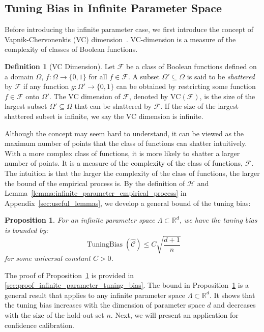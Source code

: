 \documentclass{article}
\newcommand{\1}{\mathbbm{1}}
\newcommand{\TuningBias}{\mathop{\text{TuningBias}}}
\theoremstyle{plain}
\newtheorem{proposition}[theorem]{Proposition}
\theoremstyle{definition}
\newtheorem{definition}[theorem]{Definition}
\theoremstyle{remark}
\begin{document}
\subsection{Tuning Bias in Infinite Parameter Space}
\label{subsec:infinite_parameter_tuning_bias}
Before introducing the infinite parameter case, we first introduce the concept of Vapnik-Chervonenkis (VC) dimension~\citep{vapnik1971uniform}. 
VC-dimension is a measure of the complexity of classes of Boolean functions. 
\begin{definition}[VC Dimension]
Let $\mathcal{F}$ be a class of Boolean functions defined on a domain $\Omega$,  $f: \Omega \to \{0,1\}$ for all $f \in \mathcal{F}$. A subset $\Omega' \subseteq \Omega$ is said to be \emph{shattered} by $\mathcal{F}$ if any function $g: \Omega' \to \{0,1\}$ can be obtained by restricting some function $f \in \mathcal{F}$ onto $\Omega'$. The VC dimension of $\mathcal{F}$, denoted by $\text{VC}(\mathcal{F})$, is the size of the largest subset $\Omega' \subseteq \Omega$ that can be shattered by $\mathcal{F}$. If the size of the largest shattered subset is infinite, we say the VC dimension is infinite.
\end{definition}
Although the concept may seem hard to understand, it can be viewed as the maximum number of points that the class of functions can shatter intuitively. 
With a more complex class of functions, it is more likely to shatter a larger number of points. 
It is a measure of the complexity of the class of functions, \(\mathcal{F}\).
The intuition is that the larger the complexity of the class of functions, the larger the bound of the empirical process is. 
By the definition of \(\mathcal{H}\) and Lemma~\ref{lemma:infinite_parameter_empirical_process} in Appendix~\ref{sec:useful_lemmas}, 
we develop a general bound of the tuning bias:
\begin{proposition}
    \label{prop:infinite_parameter_tuning_bias}
    For an infinite parameter space $\Lambda \subset \mathbb{R}^d$, we have the tuning bias is bounded by:
    \begin{equation*}
        \TuningBias(\widehat{\mathcal{C}}) \leq C\sqrt{\frac{d+1}{n}}
    \end{equation*}
    for some universal constant $C > 0$.
\end{proposition}
The proof of Proposition~\ref{prop:infinite_parameter_tuning_bias} is provided in \cref{sec:proof_infinite_parameter_tuning_bias}.
The bound in Proposition~\ref{prop:infinite_parameter_tuning_bias} is a general result that applies to any infinite parameter space $\Lambda \subset \mathbb{R}^d$. 
It shows that the tuning bias increases with the dimension of parameter space $d$ and decreases with the size of the hold-out set $n$.
Next, we will present an application for confidence calibration.
\end{document}
